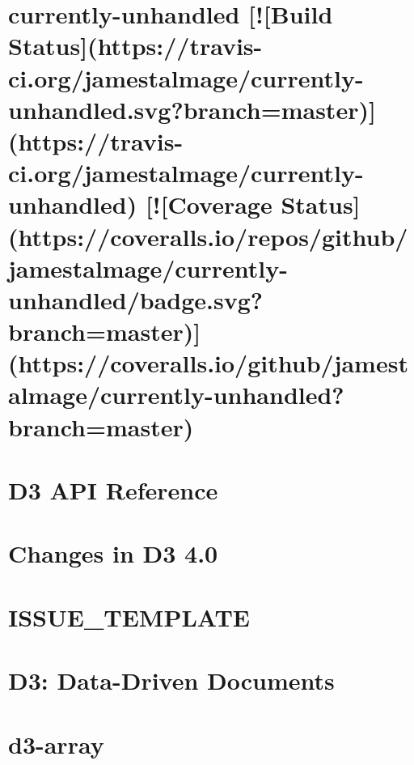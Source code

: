 \documentclass[twoside]{book}
\newcommand{\+}{\discretionary{\mbox{\scriptsize$\hookleftarrow$}}{}{}}
\begin{document}
\chapter{currently-\/unhandled \mbox{[}!\mbox{[}Build Status\mbox{]}(https\+://travis-\/ci.org/jamestalmage/currently-\/unhandled.svg?branch=master)\mbox{]}(https\+://travis-\/ci.org/jamestalmage/currently-\/unhandled) \mbox{[}!\mbox{[}Coverage Status\mbox{]}(https\+://coveralls.io/repos/github/jamestalmage/currently-\/unhandled/badge.svg?branch=master)\mbox{]}(https\+://coveralls.io/github/jamestalmage/currently-\/unhandled?branch=master)}
\label{md_dsmacc_examples_DRmerge_node_modules_currently-unhandled_readme}

\chapter{D3 A\+PI Reference}
\label{md_dsmacc_examples_DRmerge_node_modules_d3_API}

\chapter{Changes in D3 4.0}
\label{md_dsmacc_examples_DRmerge_node_modules_d3_CHANGES}

\chapter{I\+S\+S\+U\+E\+\_\+\+T\+E\+M\+P\+L\+A\+TE}
\label{md_dsmacc_examples_DRmerge_node_modules_d3_ISSUE_TEMPLATE}

\chapter{D3\+: Data-\/\+Driven Documents}
\label{md_dsmacc_examples_DRmerge_node_modules_d3_README}

\chapter{d3-\/array}
\label{md_dsmacc_examples_DRmerge_node_modules_d3-array_README}

\end{document}
